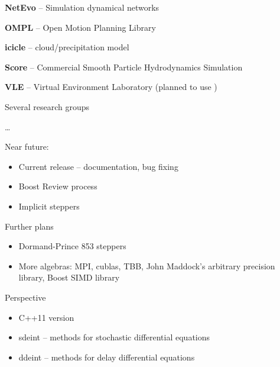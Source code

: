\begin{frame}[fragile]
 

\vspace{2ex}


\textbf{NetEvo} -- Simulation dynamical networks

\vspace{2ex}
\textbf{OMPL} -- Open Motion Planning Library

\vspace{2ex}
\textbf{icicle} -- cloud/precipitation model

\vspace{2ex}
\textbf{Score} -- Commercial Smooth Particle Hydrodynamics Simulation

\vspace{2ex}
\textbf{VLE} -- Virtual Environment Laboratory (planned to use \odeint )

\vspace{2ex}
Several research groups

\vspace{2ex}
\dots


\end{frame}





\begin{frame}

 \vspace{2ex}

Near future:
\begin{itemize}
\item Current release -- documentation, bug fixing
\item Boost Review process
\item Implicit steppers
\end{itemize}

\vspace{2ex}
Further plans 
\begin{itemize}
 \item Dormand-Prince 853 steppers
 \item More algebras: MPI, cublas, TBB, John Maddock's arbitrary precision library, Boost SIMD library
\end{itemize}

\vspace{2ex}                                                                                                       
Perspective
\begin{itemize}
 \item C++11 version
 \item sdeint -- methods for stochastic differential equations
 \item ddeint -- methods for delay differential equations
\end{itemize}







\end{frame}
